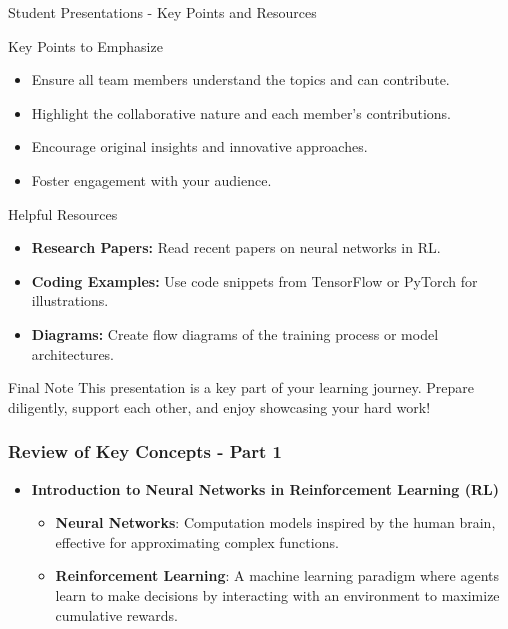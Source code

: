 \documentclass[aspectratio=169]{beamer}
\begin{document}
\begin{frame}[fragile]{Student Presentations - Key Points and Resources}
    \begin{block}{Key Points to Emphasize}
        \begin{itemize}
            \item Ensure all team members understand the topics and can contribute.
            \item Highlight the collaborative nature and each member's contributions.
            \item Encourage original insights and innovative approaches.
            \item Foster engagement with your audience.
        \end{itemize}
    \end{block}
    
    \begin{block}{Helpful Resources}
        \begin{itemize}
            \item \textbf{Research Papers:} Read recent papers on neural networks in RL.
            \item \textbf{Coding Examples:} Use code snippets from TensorFlow or PyTorch for illustrations.
            \item \textbf{Diagrams:} Create flow diagrams of the training process or model architectures.
        \end{itemize}
    \end{block}
    
    \begin{block}{Final Note}
        This presentation is a key part of your learning journey. Prepare diligently, support each other, and enjoy showcasing your hard work!
    \end{block}
\end{frame}

\begin{frame}[fragile]
    \frametitle{Review of Key Concepts - Part 1}
    \begin{itemize}
        \item \textbf{Introduction to Neural Networks in Reinforcement Learning (RL)}
        \begin{itemize}
            \item \textbf{Neural Networks}: Computation models inspired by the human brain, effective for approximating complex functions.
            \item \textbf{Reinforcement Learning}: A machine learning paradigm where agents learn to make decisions by interacting with an environment to maximize cumulative rewards.
        \end{itemize}
    \end{itemize}
\end{frame}
\end{document}

